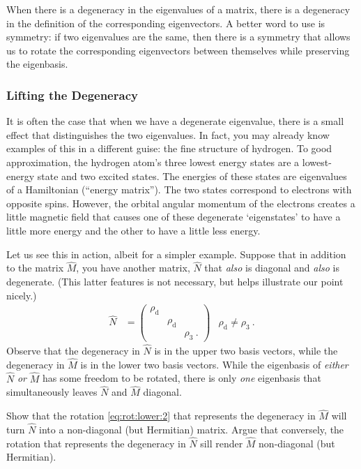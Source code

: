 \documentclass[12pt]{article}
\begin{document}
\begin{bigidea}
When there is a degeneracy in the eigenvalues of a matrix, there is a degeneracy in the definition of the corresponding eigenvectors. A better word to use is symmetry: if two eigenvalues are the same, then there is a symmetry that allows us to rotate the corresponding eigenvectors between themselves while preserving the eigenbasis.
\end{bigidea}

\subsubsection*{Lifting the Degeneracy}

It is often the case that when we have a degenerate eigenvalue, there is a small effect that distinguishes the two eigenvalues. In fact, you may already know examples of this in a different guise: the fine structure of hydrogen. To good approximation, the hydrogen atom's three lowest energy states are a lowest-energy  state and two excited  states. The energies of these states are eigenvalues of a Hamiltonian (``energy matrix''). The two  states correspond to electrons with opposite spins. However, the orbital angular momentum of the electrons creates a little magnetic field that causes one of these degenerate `eigenstates' to have a little more energy and the other to have a little less energy. 

Let us see this in action, albeit for a simpler example. Suppose that in addition to the matrix $\hat M$, you have another matrix, $\hat N$ that \emph{also} is diagonal and \emph{also} is degenerate. (This latter features is not necessary, but helps illustrate our point nicely.) 
\begin{align} 
    \hat N &= 
    \begin{pmatrix}
        \rho_\text{d} & & \\
        & \rho_\text{d} & \\
        & & \rho_3 \ .
    \end{pmatrix}
    &
    \rho_\text{d}  \neq \rho_3\ .
    \label{eq:degenerate:eigenvalue:diagonal:too} 
\end{align}
Observe that the degeneracy in $\hat N$ is in the upper two basis vectors, while the degeneracy in $\hat M$ is in the lower two basis vectors. While the eigenbasis of \emph{either} $\hat N$ \emph{or} $\hat M$ has some freedom to be rotated, there is only \emph{one} eigenbasis that simultaneously leaves $\hat N$ and $\hat M$ diagonal.
\begin{exercise}
Show that the rotation \eqref{eq:rot:lower:2} that represents the degeneracy in $\hat M$ will turn $\hat N$ into a non-diagonal (but Hermitian) matrix. Argue that conversely, the rotation that represents the degeneracy in $\hat N$ sill render $\hat M$ non-diagonal (but Hermitian).
\end{exercise}
\end{document}
